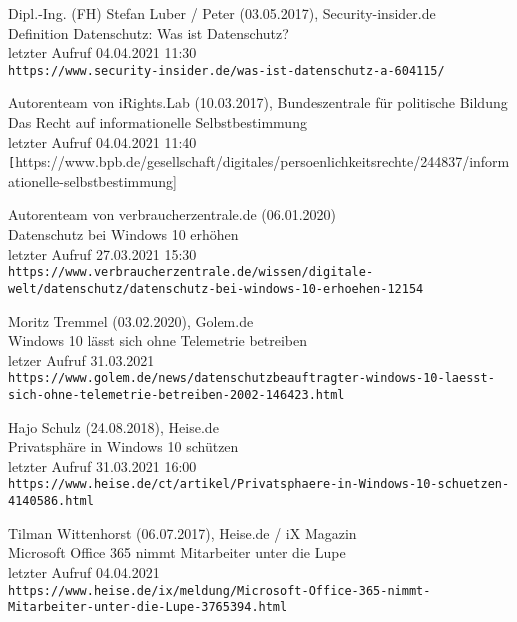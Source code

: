\begin{thebibliography}{9}
    \bibitem{}
        Dipl.-Ing. (FH) Stefan Luber / Peter (03.05.2017), Security-insider.de
        \\Definition Datenschutz: Was ist Datenschutz?
        \\letzter Aufruf 04.04.2021 11:30
        \\\texttt{https://www.security-insider.de/was-ist-datenschutz-a-604115/}

    \bibitem{}
        Autorenteam von iRights.Lab (10.03.2017), Bundeszentrale für politische Bildung
        \\Das Recht auf informationelle Selbstbestimmung
        \\letzter Aufruf 04.04.2021 11:40
        \\\texttt[https://www.bpb.de/gesellschaft/digitales/persoenlichkeitsrechte/244837/informationelle-selbstbestimmung]

    \bibitem{}
        Autorenteam von verbraucherzentrale.de (06.01.2020)
        \\Datenschutz bei Windows 10 erhöhen
        \\letzter Aufruf 27.03.2021 15:30
        \\\texttt{https://www.verbraucherzentrale.de/wissen/digitale-welt/datenschutz/datenschutz-bei-windows-10-erhoehen-12154}

    \bibitem{}
        Moritz Tremmel (03.02.2020), Golem.de
        \\Windows 10 lässt sich ohne Telemetrie betreiben
        \\letzer Aufruf 31.03.2021
        \\\texttt{https://www.golem.de/news/datenschutzbeauftragter-windows-10-laesst-sich-ohne-telemetrie-betreiben-2002-146423.html}

    \bibitem{}
        Hajo Schulz (24.08.2018), Heise.de
        \\Privatsphäre in Windows 10 schützen
        \\letzter Aufruf 31.03.2021 16:00
        \\\texttt{https://www.heise.de/ct/artikel/Privatsphaere-in-Windows-10-schuetzen-4140586.html}

    \bibitem{}
        Tilman Wittenhorst (06.07.2017), Heise.de / iX Magazin
        \\Microsoft Office 365 nimmt Mitarbeiter unter die Lupe
        \\letzter Aufruf 04.04.2021
        \\\texttt{https://www.heise.de/ix/meldung/Microsoft-Office-365-nimmt-Mitarbeiter-unter-die-Lupe-3765394.html}


\end{thebibliography}
